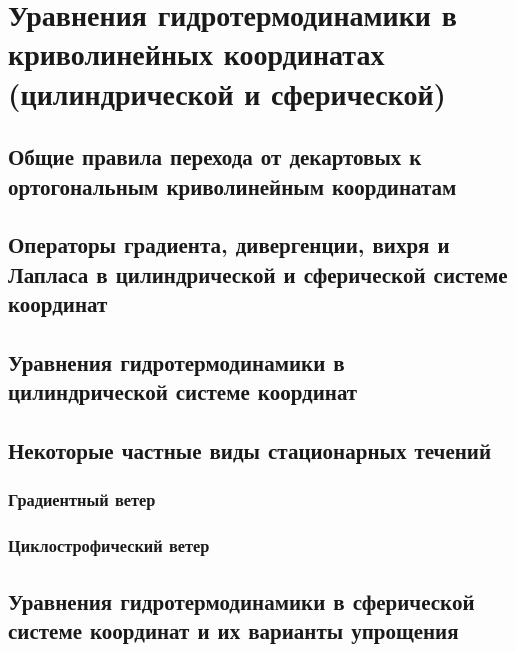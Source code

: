 \chapter{Уравнения гидротермодинамики в криволинейных координатах (цилиндрической и сферической)}

\section{Общие правила перехода от декартовых к ортогональным криволинейным координатам}

\section{Операторы градиента, дивергенции, вихря и Лапласа в цилиндрической и сферической системе координат}

\section{Уравнения гидротермодинамики в цилиндрической системе координат}

\section{Некоторые частные виды стационарных течений}

\subsection{Градиентный ветер}

\subsection{Циклострофический ветер}

\section{Уравнения гидротермодинамики в сферической системе координат и их варианты упрощения}


